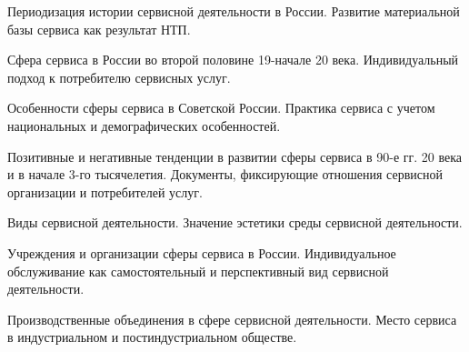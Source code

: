\documentclass[
	14pt,
	a4paper,
	]
	{scrartcl}
\begin{document}
\vfill

\newpage


\shapk
{}
\setcounter{zad}{0}

\vfill
\z Периодизация истории сервисной деятельности в России.
 \vfill
\z Развитие материальной базы сервиса  как результат НТП.
 \vfill

\vfill

\newpage


\shapk
{}
\setcounter{zad}{0}

\vfill
\z Сфера сервиса в России во второй половине 19-начале 20 века.
 \vfill
\z Индивидуальный подход к потребителю сервисных услуг.
 \vfill

\vfill

\newpage


\shapk
{}
\setcounter{zad}{0}

\vfill
\z Особенности сферы сервиса в Советской России.
 \vfill
\z Практика сервиса с учетом национальных и демографических особенностей.
 \vfill

\vfill

\newpage


\shapk
{}
\setcounter{zad}{0}

\vfill
\z Позитивные и негативные тенденции в развитии сферы сервиса в 90-е гг. 20  века и в начале 3-го тысячелетия.
 \vfill
\z Документы, фиксирующие отношения сервисной организации и потребителей услуг.
 \vfill

\vfill

\newpage


\shapk
{}
\setcounter{zad}{0}

\vfill
\z Виды сервисной деятельности.
 \vfill
\z Значение эстетики среды сервисной деятельности.
 \vfill

\vfill

\newpage


\shapk
{}
\setcounter{zad}{0}

\vfill
\z Учреждения и организации сферы сервиса в России. 
 \vfill
\z Индивидуальное обслуживание как самостоятельный и перспективный вид сервисной деятельности.
 \vfill

\vfill

\newpage


\shapk
{}
\setcounter{zad}{0}

\vfill
\z Производственные объединения в сфере сервисной деятельности.
 \vfill
\z Место сервиса в индустриальном и постиндустриальном обществе.
 \vfill
\end{document}
